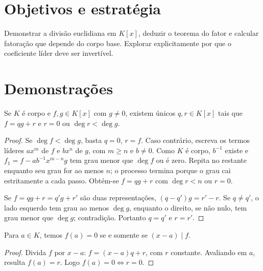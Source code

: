 \documentclass[11pt,a4paper]{article}
\begin{document}
\section{Objetivos e estratégia}
Demonstrar a divisão euclidiana em $K[x]$, deduzir o teorema do fator e calcular fatoração que depende do corpo base. Explorar explicitamente por que o coeficiente líder deve ser invertível.
\section{Demonstrações}
\begin{teorema}
Se $K$ é corpo e $f,g\in K[x]$ com $g\ne0$, existem únicos $q,r\in K[x]$ tais que $f=qg+r$ e $r=0$ ou $\deg r<\deg g$.
\end{teorema}
\begin{proof}
Se $\deg f<\deg g$, basta $q=0$, $r=f$. Caso contrário, escreva os termos líderes $a x^m$ de $f$ e $b x^n$ de $g$, com $m\ge n$ e $b\ne0$. Como $K$ é corpo, $b^{-1}$ existe e
$f_1=f-ab^{-1}x^{m-n}g$ tem grau menor que $\deg f$ ou é zero. Repita no restante enquanto seu grau for ao menos $n$; o processo termina porque o grau cai estritamente a cada passo. Obtém-se $f=qg+r$ com $\deg r<n$ ou $r=0$.

Se $f=qg+r=q'g+r'$ são duas representações, $(q-q')g=r'-r$. Se $q\ne q'$, o lado esquerdo tem grau ao menos $\deg g$, enquanto o direito, se não nulo, tem grau menor que $\deg g$; contradição. Portanto $q=q'$ e $r=r'$.
\end{proof}
\begin{proposicao}
Para $a\in K$, temos $f(a)=0$ se e somente se $(x-a)\mid f$.
\end{proposicao}
\begin{proof}
Divida $f$ por $x-a$: $f=(x-a)q+r$, com $r$ constante. Avaliando em $a$, resulta $f(a)=r$. Logo $f(a)=0\iff r=0$.
\end{proof}
\end{document}
